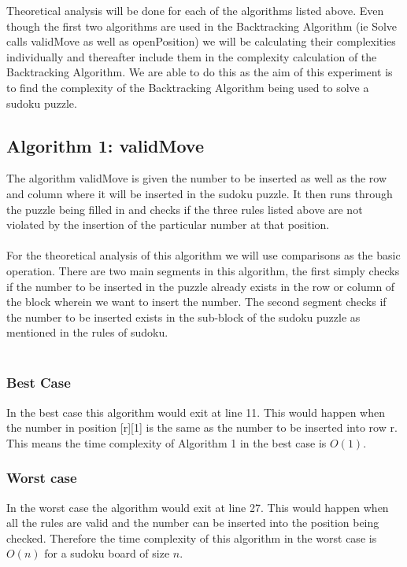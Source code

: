 \documentclass[12pt,a4paper,titlepage]{article}
\begin{document}
Theoretical analysis will be done for each of the algorithms listed above. Even though the first two algorithms are used in the Backtracking Algorithm (ie Solve calls validMove as well as openPosition) we will be calculating their complexities individually and thereafter include them in the complexity calculation of the Backtracking Algorithm. We are able to do this as the aim of this experiment is to find the complexity of the Backtracking Algorithm being used to solve a sudoku puzzle.

\subsection{Algorithm 1: validMove}
 
The algorithm validMove is given the number to be inserted as well as the row and column where it will be inserted in the sudoku puzzle. It then runs through the puzzle being filled in and checks if the three rules listed above are not violated by the insertion of the particular number at that position.
\\
\\
For the theoretical analysis of this algorithm we will use comparisons as the basic operation. There are two main segments in this algorithm, the first simply checks if  the number to be inserted in the puzzle already exists in the row or column of the block wherein we want to insert the number. The second segment checks if the number to be inserted exists in the sub-block of the sudoku puzzle as mentioned in the rules of sudoku.
\\
\\

\subsubsection{Best Case}

In the best case this algorithm would exit at line 11. This would happen when the number in position [r][1] is the same as the number to be inserted into row r. This means the time complexity of Algorithm 1 in the best case is $O(1)$.

\subsubsection{Worst case}

In the worst case the algorithm would exit at line 27. This would happen when all the rules are valid and the number can be inserted into the position being checked. Therefore the time complexity of this algorithm in the worst case is $O(n)$ for a sudoku board of size $n$.
\end{document}
